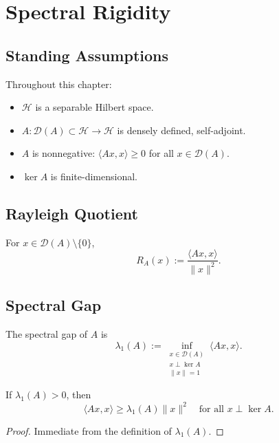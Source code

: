 \chapter{Spectral Rigidity}

\section*{Standing Assumptions}

Throughout this chapter:

\begin{itemize}
\item $\mathcal{H}$ is a separable Hilbert space.
\item $A : \mathcal{D}(A) \subset \mathcal{H} \to \mathcal{H}$ is densely defined, self-adjoint.
\item $A$ is nonnegative: $\langle Ax,x\rangle \ge 0$ for all $x\in\mathcal{D}(A)$.
\item $\ker A$ is finite-dimensional.
\end{itemize}

\section{Rayleigh Quotient}

\begin{definition}
For $x \in \mathcal{D}(A)\setminus\{0\}$,
\[
R_A(x) := \frac{\langle Ax,x\rangle}{\|x\|^2}.
\]
\end{definition}

\section{Spectral Gap}

\begin{definition}
The spectral gap of $A$ is
\[
\lambda_1(A)
:=
\inf_{\substack{x \in \mathcal{D}(A)\\ x \perp \ker A \\ \|x\|=1}}
\langle Ax,x\rangle.
\]
\end{definition}

\begin{lemma}
If $\lambda_1(A)>0$, then
\[
\langle Ax,x\rangle \ge \lambda_1(A)\|x\|^2
\quad
\text{for all } x \perp \ker A.
\]
\end{lemma}

\begin{proof}
Immediate from the definition of $\lambda_1(A)$.
\end{proof}

